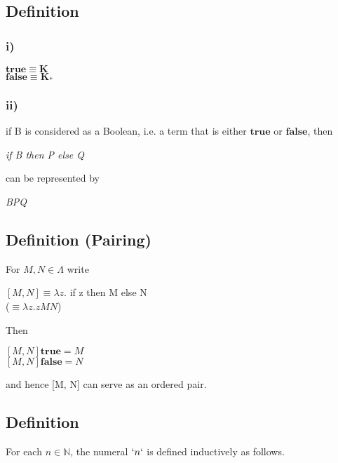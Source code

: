 \documentclass[11pt]{article}
\begin{document}
\subsection*{Definition}
\subsubsection*{i)}

\begin{center}$\mathbf{true \equiv K}$ \\
$\mathbf{false \equiv K_*}$\end{center}

\subsubsection*{ii)}
if B is considered as a Boolean, i.e. a term that is either $\mathbf{true}$ or $\mathbf{false}$, then

\begin{center}\emph{if B then P else Q}\end{center}

can be represented by 

\begin{center}\emph{BPQ}\end{center}

\subsection*{Definition (Pairing)}
For $M,N \in \Lambda$ write

\begin{center}$[M, N] \equiv \lambda z.$ if z then M else N \\
($\equiv \lambda z.zMN$)
\end{center}

Then

\begin{center}$[M, N] \mathbf{true} = M$ \\
$[M, N] \mathbf{false} = N$\end{center}

and hence [M, N] can serve as an ordered pair.

\subsection*{Definition}

For each $n \in \mathbb{N}$, the numeral $`n`$ is defined inductively as follows.
\end{document}
